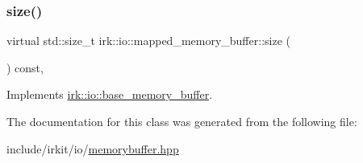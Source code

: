 \subsubsection{\texorpdfstring{size()}{size()}}
{\footnotesize\ttfamily virtual std\+::size\+\_\+t irk\+::io\+::mapped\+\_\+memory\+\_\+buffer\+::size (\begin{DoxyParamCaption}{ }\end{DoxyParamCaption}) const\hspace{0.3cm}{\ttfamily [inline]}, {\ttfamily [virtual]}}



Implements \mbox{\hyperlink{classirk_1_1io_1_1base__memory__buffer_ae634ab934981e7e4baf5e1e67ef3b006}{irk\+::io\+::base\+\_\+memory\+\_\+buffer}}.



The documentation for this class was generated from the following file\+:\begin{DoxyCompactItemize}
\item 
include/irkit/io/\mbox{\hyperlink{memorybuffer_8hpp}{memorybuffer.\+hpp}}\end{DoxyCompactItemize}
